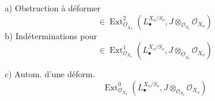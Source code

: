 a) Obstruction à déformer
\[
\in\operatorname{Ext}^2_{\underline O_{X_o}}(L_\bullet^{X_o/S_o},J\otimes_{\mathcal O_{S_o}}\mathcal O_{X_o})
\]
b) Indéterminations pour 
\[
\in\operatorname{Ext}^1_{\mathcal O_{X_o}}(L_\bullet^{X_o/S_o},J\otimes_{\underline O_{S_o}}\mathcal O_{X_o})
\]

c) Autom. d'une déform.
\[
\operatorname{Ext}^0_{\mathcal O_{X_o}}(L_\bullet^{X_o/S_o},J\otimes_{\mathcal O_{S_o}}\mathcal O_{X_o})
\]
